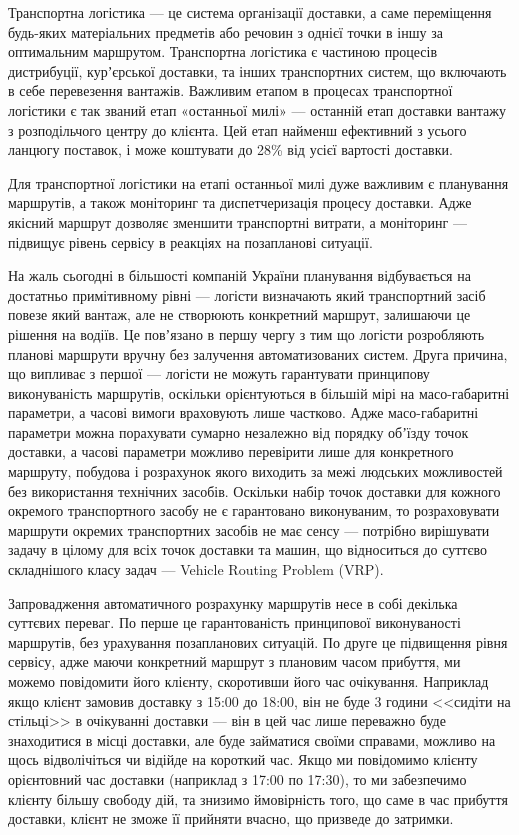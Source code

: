 Транспортна логістика --- це система організації доставки, а саме переміщення будь-яких матеріальних предметів або речовин з однієї точки в іншу за оптимальним маршрутом. Транспортна логістика є частиною процесів дистрибуції, курʼєрської доставки, та інших транспортних систем, що включають в себе перевезення вантажів. Важливим етапом в процесах транспортної логістики є так званий етап «останньої милі» --- останній етап доставки вантажу з розподільчого центру до клієнта. Цей етап найменш ефективний з усього ланцюгу поставок, і може коштувати до 28\% від усієї вартості доставки. \cite{Scott_2009}

Для транспортної логістики на етапі останньої милі дуже важливим є планування маршрутів, а також моніторинг та диспетчеризація процесу доставки. Адже якісний маршрут дозволяє зменшити транспортні витрати, а моніторинг --- підвищує рівень сервісу в реакціях на позапланові ситуації. 

На жаль сьогодні в більшості компаній України планування відбувається на достатньо примітивному рівні --- логісти визначають який транспортний засіб повезе який вантаж, але не створюють конкретний маршрут, залишаючи це рішення на водіїв. Це повʼязано в першу чергу з тим що логісти розробляють планові маршрути вручну без залучення автоматизованих систем. Друга причина, що випливає з першої --- логісти не можуть гарантувати принципову виконуваність маршрутів, оскільки орієнтуються в більшій мірі на масо-габаритні параметри, а часові вимоги враховують лише частково. Адже масо-габаритні параметри можна порахувати сумарно незалежно від порядку обʼїзду точок доставки, а часові параметри можливо перевірити лише для конкретного маршруту, побудова і розрахунок якого виходить за межі людських можливостей без використання технічних засобів. Оскільки набір точок доставки для кожного окремого транспортного засобу не є гарантовано виконуваним, то розраховувати маршрути окремих транспортних засобів не має сенсу --- потрібно вирішувати задачу в цілому для всіх точок доставки та машин, що відноситься до суттєво складнішого класу задач --- Vehicle Routing Problem (VRP).

Запровадження автоматичного розрахунку маршрутів несе в собі декілька суттєвих переваг. По перше це гарантованість принципової виконуваності маршрутів, без урахування позапланових ситуацій. По друге це підвищення рівня сервісу, адже маючи конкретний маршрут з плановим часом прибуття, ми можемо повідомити його клієнту, скоротивши його час очікування. Наприклад якщо клієнт замовив доставку з 15:00 до 18:00, він не буде 3 години <<сидіти на стільці>> в очікуванні доставки --- він в цей час лише переважно буде знаходитися в місці доставки, але буде займатися своїми справами, можливо на щось відволічіться чи відійде на короткий час. Якщо ми повідомимо клієнту орієнтовний час доставки (наприклад з 17:00 по 17:30), то ми забезпечимо клієнту більшу свободу дій, та знизимо ймовірність того, що саме в час прибуття доставки, клієнт не зможе її прийняти вчасно, що призведе до затримки.


